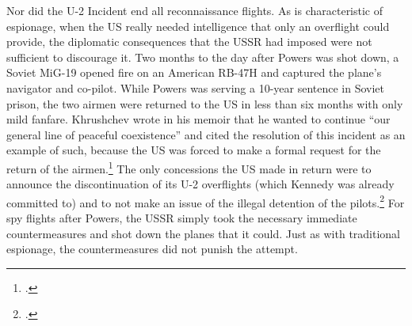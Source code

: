 \documentclass[14pt]{extarticle}
\begin{document}
Nor did the U-2 Incident end all reconnaissance flights. As is characteristic of espionage, when the US really needed intelligence that only an overflight could provide, the diplomatic consequences that the USSR had imposed were not sufficient to discourage it. Two months to the day after Powers was shot down, a Soviet MiG-19 opened fire on an American RB-47H and captured the plane's navigator and co-pilot. While Powers was serving a 10-year sentence in Soviet prison, the two airmen were returned to the US in less than six months with only mild fanfare. Khrushchev wrote in his memoir that he wanted to continue \enquote{our general line of peaceful coexistence} and cited the resolution of this incident as an example of such, because the US was forced to make a formal request for the return of the airmen.\footcite[p.~256-257]{khrushchev_memoirs_2007} The only concessions the US made in return were to announce the discontinuation of its U-2 overflights (which Kennedy was already committed to) and to not make an issue of the illegal detention of the pilots.\footcite{time_cold_1961} For spy flights after Powers, the USSR simply took the necessary immediate countermeasures and shot down the planes that it could. Just as with traditional espionage, the countermeasures did not punish the attempt.
\end{document}
